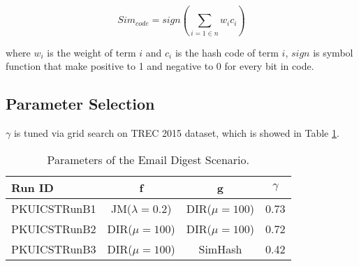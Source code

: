 \begin{itemize}
\begin{equation}
\label{equ:lm}
Sim_{code} = sign(\sum_{i=1 \in n} w_{i} c_{i})
\end{equation}

where $w_{i}$ is the weight of term $i$ and $c_{i}$ is the hash code of term $i$, $sign$ is symbol function that make positive to 1 and negative to 0 for every bit in code.

\end{itemize}

\subsection{Parameter Selection}
$\gamma$ is tuned via grid search on TREC 2015 dataset,
which is showed in Table \ref{tab:paraB}.

\begin{table}[htbp]
\centering
\caption{Parameters of the Email Digest Scenario.}
\label{tab:paraB}
\begin{tabular}{lccc}
\hline
Run ID&f&g&$\gamma$\\
\hline
PKUICSTRunB1&JM($\lambda=0.2$)&DIR($\mu=100$)&0.73\\
PKUICSTRunB2&DIR($\mu=100$)&DIR($\mu=100$)&0.72\\
PKUICSTRunB3&DIR($\mu=100$)&SimHash&0.42\\
\hline
\end{tabular}
\end{table}


